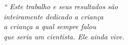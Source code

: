\begin{epigrafe}
	\vspace*{\fill}
	\begin{flushright}
		\textit{``
		Este trabalho e seus resultados são
		\\ inteiramente dedicado a criança
		\\ a criança a qual sempre falou 
		\\ que seria um cientista. Ele ainda vive.}
	\end{flushright}
\end{epigrafe}
